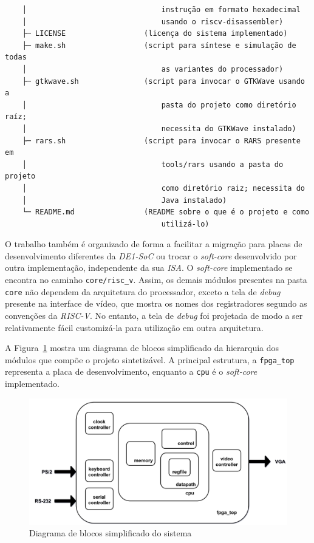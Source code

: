 \begin{verbatim}
    │                               instrução em formato hexadecimal
    │                               usando o riscv-disassembler)
    ├─ LICENSE                  (licença do sistema implementado)
    ├─ make.sh                  (script para síntese e simulação de todas
    │                               as variantes do processador)
    ├─ gtkwave.sh               (script para invocar o GTKWave usando a
    │                               pasta do projeto como diretório raíz;
    │                               necessita do GTKWave instalado)
    ├─ rars.sh                  (script para invocar o RARS presente em
    │                               tools/rars usando a pasta do projeto
    │                               como diretório raiz; necessita do
    │                               Java instalado)
    └─ README.md                (README sobre o que é o projeto e como
                                    utilizá-lo)
\end{verbatim}


    { O trabalho também é organizado de forma a facilitar a migração para placas de
        desenvolvimento diferentes da \textit{DE1-SoC} ou trocar o \textit{soft-core}
        desenvolvido por outra implementação, independente da sua \textit{ISA}.
        O \textit{soft-core} implementado se encontra no caminho
        \texttt{core/risc\_v}. Assim, os demais módulos presentes na pasta \texttt{core}
        não dependem da arquitetura do processador, exceto a tela de
        \textit{debug} presente na interface de vídeo, que mostra os nomes dos
        registradores segundo as convenções da \textit{RISC-V}. No entanto, a tela de
        \textit{debug} foi projetada de modo a ser relativamente fácil
        customizá-la para utilização em outra arquitetura.
    }

    { A Figura~\ref{fig:diagram_fpga_blocks} mostra um diagrama de blocos simplificado
        da hierarquia dos módulos que compõe o projeto sintetizável. A principal
        estrutura, a \texttt{fpga\_top} representa a placa de desenvolvimento, enquanto
        a \texttt{cpu} é o \textit{soft-core} implementado.
    }

    \begin{figure}[H]
    \centering
        \includegraphics[width=0.9\linewidth]{../images/fpga/fpga_simplified_block_diagram.png}
        \caption{Diagrama de blocos simplificado do sistema}\label{fig:diagram_fpga_blocks}
    \end{figure}

